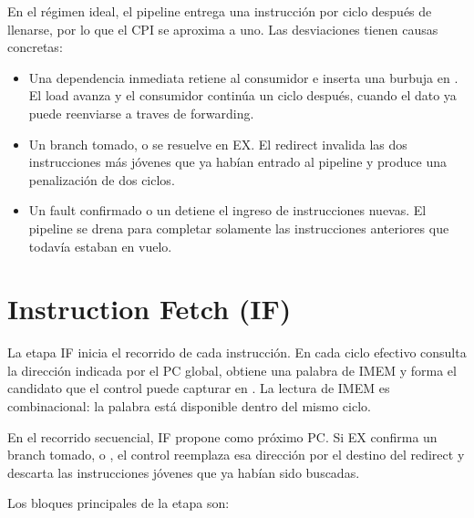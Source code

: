 En el régimen ideal, el pipeline entrega una instrucción por ciclo después de
llenarse, por lo que el CPI se aproxima a uno. Las desviaciones tienen causas
concretas:

\begin{itemize}
  \item Una dependencia inmediata  retiene al consumidor e
    inserta una burbuja en . El load avanza y el consumidor
    continúa un ciclo después, cuando el dato ya puede reenviarse a traves de forwarding.
  \item Un branch tomado,  o  se resuelve en EX. El
    redirect invalida las dos instrucciones más jóvenes que ya habían entrado
    al pipeline y produce una penalización de dos ciclos.
  \item Un fault confirmado o un  detiene el ingreso de instrucciones
    nuevas. El pipeline se drena para completar solamente las instrucciones
    anteriores que todavía estaban en vuelo.
\end{itemize}

\section{Instruction Fetch (IF)}

La etapa IF inicia el recorrido de cada instrucción. En cada ciclo efectivo
consulta la dirección indicada por el PC global, obtiene una palabra de IMEM y
forma el candidato que el control puede capturar en . La lectura de IMEM es
combinacional: la palabra está disponible dentro del mismo ciclo.

En el recorrido secuencial, IF propone  como próximo PC. Si EX
confirma un branch tomado,  o , el control reemplaza esa
dirección por el destino del redirect y descarta las instrucciones jóvenes que
ya habían sido buscadas.

Los bloques principales de la etapa son:

